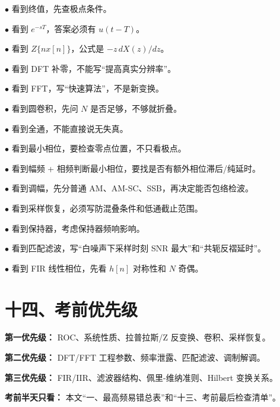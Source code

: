 \documentclass[11pt]{ctexart}
\begin{document}
\noindent\(\bullet\) 看到终值，先查极点条件。\par

\noindent\(\bullet\) 看到 \(e^{-sT}\)，答案必须有 \(u(t-T)\)。\par

\noindent\(\bullet\) 看到 \(Z\{nx[n]\}\)，公式是 \(-z\,dX(z)/dz\)。\par

\noindent\(\bullet\) 看到 DFT 补零，不能写“提高真实分辨率”。\par

\noindent\(\bullet\) 看到 FFT，写“快速算法”，不是新变换。\par

\noindent\(\bullet\) 看到圆卷积，先问 \(N\) 是否足够，不够就折叠。\par

\noindent\(\bullet\) 看到全通，不能直接说无失真。\par

\noindent\(\bullet\) 看到最小相位，要检查零点位置，不只看极点。\par

\noindent\(\bullet\) 看到幅频 + 相频判断最小相位，要找是否有额外相位滞后/纯延时。\par

\noindent\(\bullet\) 看到调幅，先分普通 AM、AM-SC、SSB，再决定能否包络检波。\par

\noindent\(\bullet\) 看到采样恢复，必须写防混叠条件和低通截止范围。\par

\noindent\(\bullet\) 看到保持器，考虑保持器频响影响。\par

\noindent\(\bullet\) 看到匹配滤波，写“白噪声下采样时刻 SNR 最大”和“共轭反褶延时”。\par

\noindent\(\bullet\) 看到 FIR 线性相位，先看 \(h[n]\) 对称性和 \(N\) 奇偶。\par



\section*{十四、考前优先级}



\textbf{第一优先级：} ROC、系统性质、拉普拉斯/Z 反变换、卷积、采样恢复。\par



\textbf{第二优先级：} DFT/FFT 工程参数、频率泄露、匹配滤波、调制解调。\par



\textbf{第三优先级：} FIR/IIR、滤波器结构、佩里-维纳准则、Hilbert 变换关系。\par



\textbf{考前半天只看：} 本文“一、最高频易错总表”和“十三、考前最后检查清单”。\par
\end{document}
